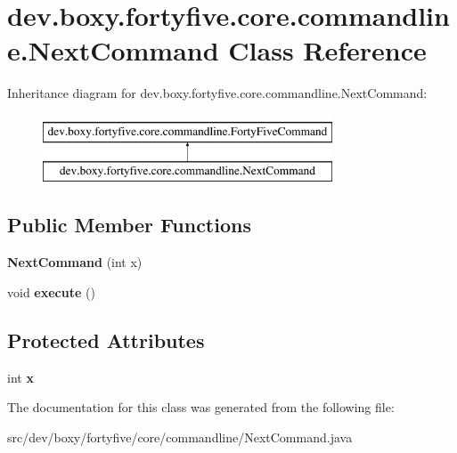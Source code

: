 \hypertarget{classdev_1_1boxy_1_1fortyfive_1_1core_1_1commandline_1_1_next_command}{
\section{dev.boxy.fortyfive.core.commandline.NextCommand Class Reference}
\label{d8/da1/classdev_1_1boxy_1_1fortyfive_1_1core_1_1commandline_1_1_next_command}
}
Inheritance diagram for dev.boxy.fortyfive.core.commandline.NextCommand:\begin{figure}[H]
\begin{center}
\leavevmode
\includegraphics[height=2.000000cm]{d8/da1/classdev_1_1boxy_1_1fortyfive_1_1core_1_1commandline_1_1_next_command}
\end{center}
\end{figure}
\subsection*{Public Member Functions}
\begin{DoxyCompactItemize}
\item 
\hypertarget{classdev_1_1boxy_1_1fortyfive_1_1core_1_1commandline_1_1_next_command_a4f4ced8914d1401d6ebc5c82389afe2e}{
{\bfseries NextCommand} (int x)}
\label{d8/da1/classdev_1_1boxy_1_1fortyfive_1_1core_1_1commandline_1_1_next_command_a4f4ced8914d1401d6ebc5c82389afe2e}

\item 
\hypertarget{classdev_1_1boxy_1_1fortyfive_1_1core_1_1commandline_1_1_next_command_ae2f457fafa10a98959a6e367146c4a12}{
void {\bfseries execute} ()}
\label{d8/da1/classdev_1_1boxy_1_1fortyfive_1_1core_1_1commandline_1_1_next_command_ae2f457fafa10a98959a6e367146c4a12}

\end{DoxyCompactItemize}
\subsection*{Protected Attributes}
\begin{DoxyCompactItemize}
\item 
\hypertarget{classdev_1_1boxy_1_1fortyfive_1_1core_1_1commandline_1_1_next_command_a1f94313d379521eaf928569d6113f893}{
int {\bfseries x}}
\label{d8/da1/classdev_1_1boxy_1_1fortyfive_1_1core_1_1commandline_1_1_next_command_a1f94313d379521eaf928569d6113f893}

\end{DoxyCompactItemize}


The documentation for this class was generated from the following file:\begin{DoxyCompactItemize}
\item 
src/dev/boxy/fortyfive/core/commandline/NextCommand.java\end{DoxyCompactItemize}
